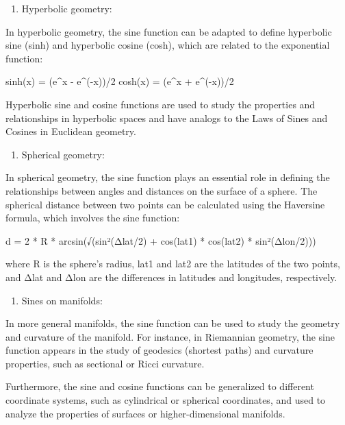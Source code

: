 \documentclass[
]{article}
\providecommand{\tightlist}{%
  \setlength{\itemsep}{0pt}\setlength{\parskip}{0pt}}
\begin{document}
\begin{enumerate}
\def\labelenumi{\arabic{enumi}.}
\setcounter{enumi}{1}
\tightlist
\item
  Hyperbolic geometry:
\end{enumerate}

In hyperbolic geometry, the sine function can be adapted to define
hyperbolic sine (sinh) and hyperbolic cosine (cosh), which are related
to the exponential function:

sinh(x) = (e\^{}x - e\^{}(-x))/2 cosh(x) = (e\^{}x + e\^{}(-x))/2

Hyperbolic sine and cosine functions are used to study the properties
and relationships in hyperbolic spaces and have analogs to the Laws of
Sines and Cosines in Euclidean geometry.

\begin{enumerate}
\def\labelenumi{\arabic{enumi}.}
\setcounter{enumi}{2}
\tightlist
\item
  Spherical geometry:
\end{enumerate}

In spherical geometry, the sine function plays an essential role in
defining the relationships between angles and distances on the surface
of a sphere. The spherical distance between two points can be calculated
using the Haversine formula, which involves the sine function:

d = 2 * R * arcsin(√(sin²(Δlat/2) + cos(lat1) * cos(lat2) *
sin²(Δlon/2)))

where R is the sphere's radius, lat1 and lat2 are the latitudes of the
two points, and Δlat and Δlon are the differences in latitudes and
longitudes, respectively.

\begin{enumerate}
\def\labelenumi{\arabic{enumi}.}
\setcounter{enumi}{3}
\tightlist
\item
  Sines on manifolds:
\end{enumerate}

In more general manifolds, the sine function can be used to study the
geometry and curvature of the manifold. For instance, in Riemannian
geometry, the sine function appears in the study of geodesics (shortest
paths) and curvature properties, such as sectional or Ricci curvature.

Furthermore, the sine and cosine functions can be generalized to
different coordinate systems, such as cylindrical or spherical
coordinates, and used to analyze the properties of surfaces or
higher-dimensional manifolds.
\end{document}
